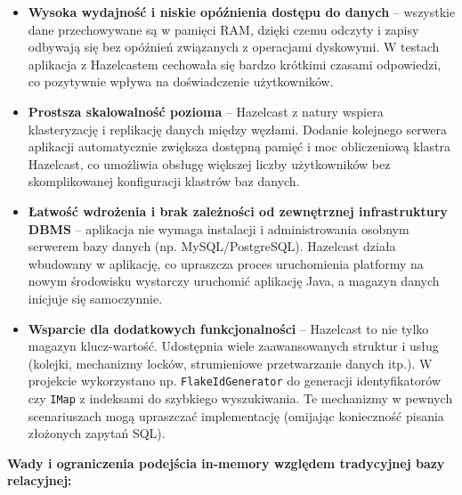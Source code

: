 \begin{itemize}
\item \textbf{Wysoka wydajność i niskie opóźnienia dostępu do danych} – wszystkie dane przechowywane są w pamięci RAM, dzięki czemu odczyty i zapisy odbywają się bez opóźnień związanych z operacjami dyskowymi. W testach aplikacja z Hazelcastem cechowała się bardzo krótkimi czasami odpowiedzi, co pozytywnie wpływa na doświadczenie użytkowników.
\item \textbf{Prostsza skalowalność pozioma} – Hazelcast z natury wspiera klasteryzację i replikację danych między węzłami. Dodanie kolejnego serwera aplikacji automatycznie zwiększa dostępną pamięć i moc obliczeniową klastra Hazelcast, co umożliwia obsługę większej liczby użytkowników bez skomplikowanej konfiguracji klastrów baz danych.
\item \textbf{Łatwość wdrożenia i brak zależności od zewnętrznej infrastruktury DBMS} – aplikacja nie wymaga instalacji i administrowania osobnym serwerem bazy danych (np. MySQL/PostgreSQL). Hazelcast działa wbudowany w aplikację, co upraszcza proces uruchomienia platformy na nowym środowisku  wystarczy uruchomić aplikację Java, a magazyn danych inicjuje się samoczynnie.
\item \textbf{Wsparcie dla dodatkowych funkcjonalności} – Hazelcast to nie tylko magazyn klucz-wartość. Udostępnia wiele zaawansowanych struktur i usług (kolejki, mechanizmy locków, strumieniowe przetwarzanie danych itp.). W projekcie wykorzystano np. \texttt{FlakeIdGenerator} do generacji identyfikatorów czy \texttt{IMap} z indeksami do szybkiego wyszukiwania. Te mechanizmy w pewnych scenariuszach mogą upraszczać implementację (omijając konieczność pisania złożonych zapytań SQL).
\end{itemize} \textbf{Wady i ograniczenia podejścia in-memory względem tradycyjnej bazy relacyjnej:}
